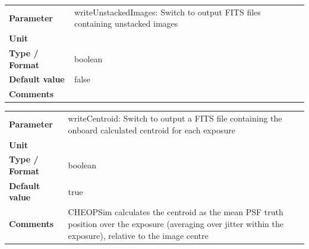 \documentclass[11pt]{article}      %
\def\HCode#1{}
\def\htmlanchor#1{\HCode{<a id="#1"></a>}}
\begin{document}
\begin{table}[hb]
  \htmlanchor{writeUnstackedImages}
  \begin{tabular}{| l | p{13cm} |}
    \hline 
    {\bf Parameter} & writeUnstackedImages: Switch to output FITS files containing unstacked images\\
    {\bf Unit} & \\
    {\bf Type / Format} & boolean\\
    {\bf Default value} & false\\
    {\bf Comments} & \\
    \hline
  \end{tabular}
  \bigskip

  \htmlanchor{writeCentroid}
  \begin{tabular}{| l | p{13cm} |}
    \hline 
    {\bf Parameter} & writeCentroid: Switch to output a FITS file containing the onboard calculated centroid for each exposure\\
    {\bf Unit} & \\
    {\bf Type / Format} & boolean\\
    {\bf Default value} & true\\
    {\bf Comments} & CHEOPSim calculates the centroid as the mean PSF truth position over the exposure (averaging over jitter within the exposure), relative to the image centre\\
    \hline
  \end{tabular}
  \bigskip

  \label{tab:output1}
\end{table}
\end{document}
